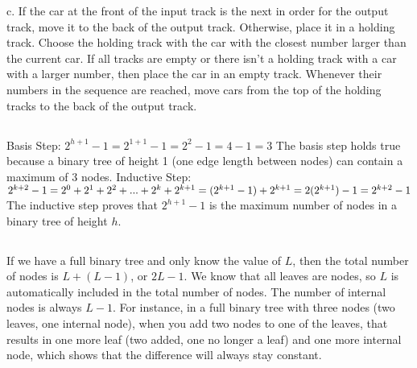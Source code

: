 \documentclass{article}
\begin{document}
\newline
c. If the car at the front of the input track is the next in order for the output track, move it to the back of the output track. Otherwise, place it in a holding track. Choose the holding track with the car with the closest number larger than the current car. If all tracks are empty or there isn't a holding track with a car with a larger number, then place the car in an empty track. Whenever their numbers in the sequence are reached, move cars from the top of the holding tracks to the back of the output track.

\newpage
\subsection{}
Basis Step: $2^{h + 1} - 1 = 2^{1 + 1} - 1 = 2^2 - 1 = 4 - 1 = 3$
\newline
The basis step holds true because a binary tree of height 1 (one edge length between nodes) can contain a maximum of 3 nodes.
\newline
Inductive Step:
\newline
$2^{k + 2} - 1
\newline
= 2^0 + 2^1 + 2^2 + ... + 2^k + 2^{k + 1}
\newline
= (2^{k + 1} - 1) + 2^{k + 1}
\newline
= 2(2^{k + 1}) - 1
\newline
= 2^{k + 2} - 1$
\newline
The inductive step proves that $2^{h + 1} - 1$ is the maximum number of nodes in a binary tree of height $h$.

\subsection{}
If we have a full binary tree and only know the value of $L$, then the total number of nodes is $L + (L - 1)$, or $2L - 1$. We know that all leaves are nodes, so $L$ is automatically included in the total number of nodes. The number of internal nodes is always $L - 1$. For instance, in a full binary tree with three nodes (two leaves, one internal node), when you add two nodes to one of the leaves, that results in one more leaf (two added, one no longer a leaf) and one more internal node, which shows that the difference will always stay constant.
\end{document}
